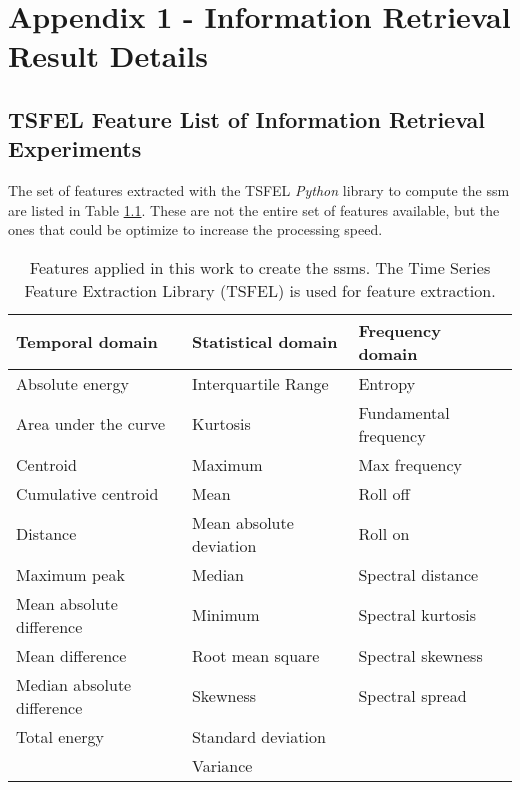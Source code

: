 
%

\chapter{Appendix 1 - Information Retrieval Result Details}
\label{appendix:tables_detailed}

\section{TSFEL Feature List of Information Retrieval Experiments}
\label{app:tsfel}

The set of features extracted with the TSFEL \textit{Python} library to compute the \gls{ssm} are listed in Table \ref{tab:tsfel_featurelist}. These are not the entire set of features available, but the ones that could be optimize to increase the processing speed.  

\begin{table}[H]
    \centering
    \caption{Features applied in this work to create the \gls{ssm}s. The Time Series Feature Extraction Library (TSFEL) is used for feature extraction.}
    \begin{tabular}{l|l|l}
    \toprule
        \textbf{Temporal domain} &  \textbf{Statistical domain} & \textbf{Frequency domain}\\
    \midrule
        Absolute energy & Interquartile Range & Entropy\\
        Area under the curve & Kurtosis & Fundamental frequency\\
        Centroid & Maximum & Max frequency\\
        Cumulative centroid & Mean & Roll off\\
        Distance & Mean absolute deviation & Roll on \\
        Maximum peak & Median & Spectral distance\\
        Mean absolute difference & Minimum & Spectral kurtosis\\
        Mean difference & Root mean square & Spectral skewness\\
        Median absolute difference & Skewness & Spectral spread\\
        Total energy & Standard deviation & \\
         & Variance & \\
    \bottomrule
    \end{tabular}
    \label{tab:tsfel_featurelist}
\end{table}

